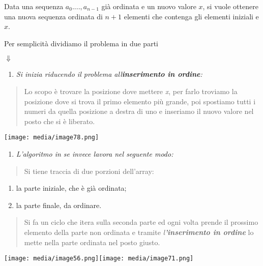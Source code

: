 Data una sequenza \(a_{0}....,a_{n - 1}\) già ordinata e un nuovo valore
\(x\), si vuole ottenere una nuova sequenza ordinata di \(n + 1\)
elementi che contenga gli elementi iniziali e \(x\).

Per semplicità dividiamo il problema in due parti

\(\Downarrow\)

\begin{enumerate}
\def\labelenumi{\arabic{enumi}.}
\item
  \emph{Si inizia riducendo il problema
  all\textquotesingle{}\textbf{inserimento in ordine}:}
\end{enumerate}

\begin{quote}
Lo scopo è trovare la posizione dove mettere \emph{x}, per farlo
troviamo la posizione dove si trova il primo elemento più grande, poi
spostiamo tutti i numeri da quella posizione a destra di uno e inseriamo
il nuovo valore nel posto che si è liberato.
\end{quote}

\texttt{[image: media/image78.png]}

\begin{enumerate}
\def\labelenumi{\arabic{enumi}.}
\setcounter{enumi}{1}
\item
  \emph{L'algoritmo in se invece lavora nel seguente modo:}
\end{enumerate}

\begin{quote}
Si tiene traccia di due porzioni dell'array:
\end{quote}

\begin{enumerate}
\def\labelenumi{\arabic{enumi}.}
\item
  la parte iniziale, che è già ordinata;
\item
  la parte finale, da ordinare.
\end{enumerate}

\begin{quote}
Si fa un ciclo che itera sulla seconda parte ed ogni volta prende il
prossimo elemento della parte non ordinata e tramite
\emph{l\textbf{'inserimento in ordine}} lo mette nella parte ordinata
nel posto giusto.
\end{quote}

\texttt{[image: media/image56.png]}\texttt{[image: media/image71.png]}

